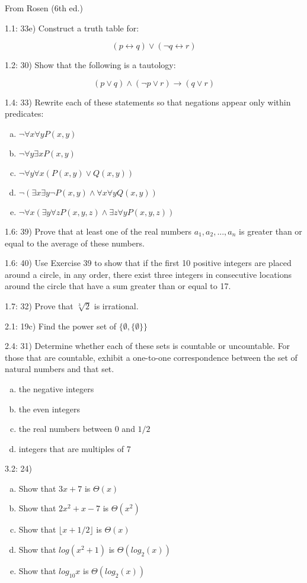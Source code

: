 \documentclass{report}
\begin{document}
From Rosen (6th ed.)

1.1: 33e) Construct a truth table for:

\[
(p \leftrightarrow q) \vee (\neg q \leftrightarrow r)
\]

1.2: 30) Show that the following is a tautology:

\[
(p \vee q) \wedge (\neg p \vee r) \rightarrow (q \vee r)
\]

1.4: 33) Rewrite each of these statements so that negations appear only within predicates:

\begin{enumerate}[a)]
\item $ \neg \forall x \forall y P(x,y) $
\item $ \neg \forall y \exists x P(x,y) $
\item $ \neg \forall y \forall x (P(x,y) \vee Q(x,y)) $
\item $ \neg ( \exists x \exists y \neg P(x,y) \wedge \forall x \forall y Q(x,y)) $
\item $ \neg \forall x ( \exists y \forall z P(x,y,z) \wedge \exists z \forall y P(x,y,z)) $
\end{enumerate}

1.6: 39) Prove that at least one of the real numbers $a_1,a_2,...,a_n$ is greater than or equal to the average of these numbers.

1.6: 40) Use Exercise 39 to show that if the first 10 positive integers are placed around a circle, in any order, there exist three integers in consecutive locations around the circle that have a sum greater than or equal to 17.

1.7: 32) Prove that $\sqrt[3]{2}$ is irrational.

2.1: 19c) Find the power set of $ \{ \emptyset , \{ \emptyset \} \} $

2.4: 31) Determine whether each of these sets is countable or uncountable.  For those that are countable, exhibit a one-to-one correspondence between the set of natural numbers and that set.

\begin{enumerate}[a)]
\item the negative integers
\item the even integers
\item the real numbers between 0 and $1/2$
\item integers that are multiples of 7
\end{enumerate}

3.2: 24)

\begin{enumerate}[a)]
\item Show that $3x + 7$ is $\Theta (x)$
\item Show that $2x^2+x-7$ is $\Theta (x^2)$
\item Show that $\lfloor x + 1/2 \rfloor$ is $\Theta (x)$
\item Show that $log(x^2+1)$ is $\Theta (log_2(x))$
\item Show that $log_{10}x$ is $\Theta (log_2(x))$
\end{enumerate}
\end{document}
